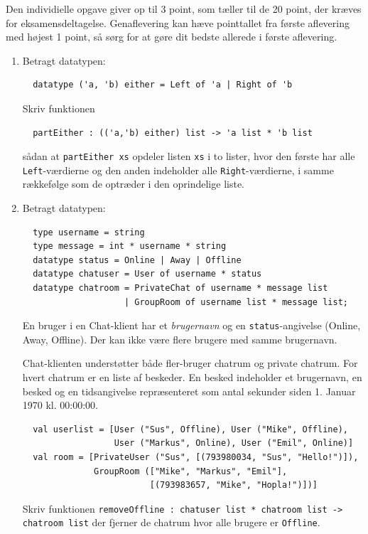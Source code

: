 \documentclass[a4paper,12pt]{article}
\begin{document}
Den individielle opgave giver op til 3 point, som tæller til de 20
point, der kræves for eksamensdeltagelse.  Genaflevering kan hæve
pointtallet fra første aflevering med højest 1 point, så sørg for at
gøre dit bedste allerede i første aflevering.

\begin{enumerate}[{4I}1]
\item Betragt datatypen:
\begin{lstlisting}
  datatype ('a, 'b) either = Left of 'a | Right of 'b
\end{lstlisting}

Skriv funktionen
\begin{lstlisting}
  partEither : (('a,'b) either) list -> 'a list * 'b list
\end{lstlisting}
sådan at \lstinline{partEither xs} opdeler listen \lstinline{xs} i to
lister, hvor den første har alle \lstinline{Left}-værdierne og den
anden indeholder alle \lstinline{Right}-værdierne, i samme rækkefølge
som de optræder i den oprindelige liste.

\item Betragt datatypen:

\begin{lstlisting}
  type username = string
  type message = int * username * string
  datatype status = Online | Away | Offline
  datatype chatuser = User of username * status
  datatype chatroom = PrivateChat of username * message list
                    | GroupRoom of username list * message list;
\end{lstlisting}
  En bruger i en Chat-klient har et \textit{brugernavn} og en
  \lstinline{status}-angivelse (Online, Away, Offline). Der kan ikke
  være flere brugere med samme brugernavn.

  Chat-klienten understøtter både fler-bruger chatrum og private
  chatrum. For hvert chatrum er en liste af beskeder. En besked
  indeholder et brugernavn, en besked og en tidsangivelse
  repræsenteret som antal sekunder siden 1. Januar 1970 kl. 00:00:00.

\begin{lstlisting}
  val userlist = [User ("Sus", Offline), User ("Mike", Offline),
                  User ("Markus", Online), User ("Emil", Online)]
  val room = [PrivateUser ("Sus", [(793980034, "Sus", "Hello!")]),
              GroupRoom (["Mike", "Markus", "Emil"],
                         [(793983657, "Mike", "Hopla!")])]
\end{lstlisting}

  Skriv funktionen \lstinline{removeOffline : chatuser list * chatroom list -> chatroom list} 
  der fjerner de chatrum hvor alle brugere er \lstinline{Offline}.


\end{enumerate}
\end{document}
